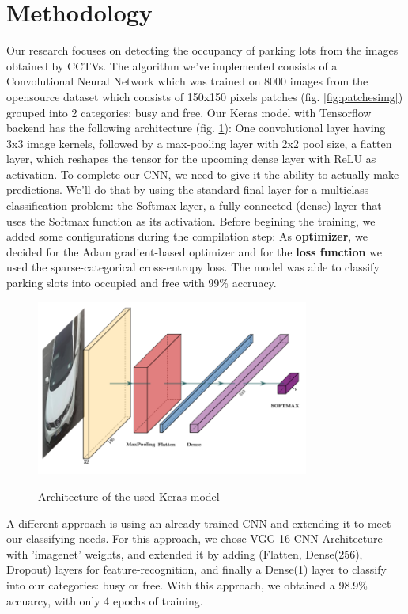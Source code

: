 \documentclass[12pt]{article}
\begin{document}
\section{Methodology}
Our research focuses on detecting the occupancy of parking lots from the images obtained by CCTVs.
The algorithm we've implemented consists of a Convolutional Neural Network which was trained on 8000 images from the opensource 
\cite{cnrpark} dataset which consists of 150x150 pixels patches (fig. \ref{fig:patchesimg}) grouped into 2 categories: busy and free.
Our Keras model with Tensorflow backend has the following architecture (fig. \ref{fig:architectureimg}): One convolutional layer having 3x3 image kernels,
followed by a max-pooling layer with 2x2 pool size, a flatten layer, which reshapes the tensor for the upcoming dense layer 
with ReLU as activation. To complete our CNN, we need to give it the ability to actually make predictions. 
We’ll do that by using the standard final layer for a multiclass classification problem: 
the Softmax layer, a fully-connected (dense) layer that uses the Softmax function as its activation.
Before begining the training, we added some configurations during the compilation step:
As \textbf{optimizer}, we decided for the Adam gradient-based optimizer and for the \textbf{loss function} 
we used the sparse-categorical cross-entropy loss. The model was able to classify parking slots into occupied and free with 99\% accruacy.

\begin{figure}
\caption{Architecture of the used Keras model}
\includegraphics[width=0.8\textwidth]{Architecture}
\label{fig:architectureimg}
\end{figure}

\par
A different approach is using an already trained CNN and extending it to meet our classifying needs.
For this approach, we chose VGG-16 CNN-Architecture with 'imagenet' weights, and extended it by adding (Flatten, Dense(256), Dropout) layers
for feature-recognition, and finally a Dense(1) layer to classify into our categories: busy or free.
With this approach, we obtained a 98.9\% accuarcy, with only 4 epochs of training.
\end{document}
